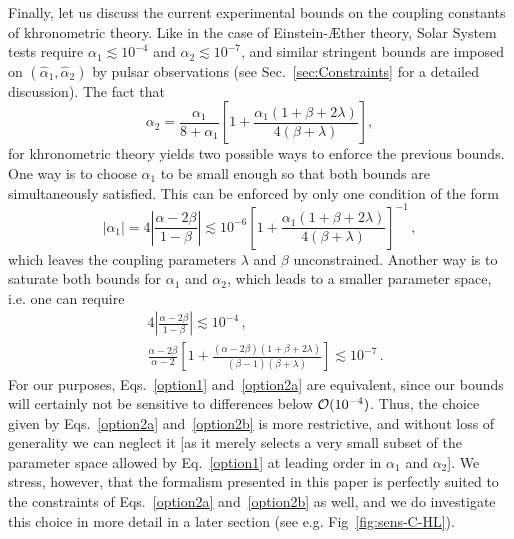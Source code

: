 \documentclass[prd,aps,twocolumn,nofootinbib,showpacs,superscriptaddress]{revtex4-1}
\newcommand\be{\begin{equation}}
\newcommand\ee{\end{equation}}
\begin{document}
Finally, let us discuss the current experimental bounds on the coupling constants of khronometric theory. 
Like in the case of Einstein-\AE ther theory, Solar System 
tests require $\alpha_1\lesssim 10^{-4}$ and $\alpha_2\lesssim 10^{-7}$, and similar stringent bounds
are imposed on $(\hat{\alpha}_1,\hat{\alpha}_2)$ by pulsar observations (see Sec.~\ref{sec:Constraints} for a detailed discussion). The fact that 
\be
\alpha_2=\frac{\alpha_1}{8+\alpha_1}\left[1+\frac{\alpha_1(1+\beta+2\lambda)}{4(\beta+\lambda)}\right],
\ee 
for khronometric theory \cite{Blas:2011zd}
 yields two possible ways 
to enforce the previous bounds. One way is to choose $\alpha_1$ to be small enough so that both bounds are simultaneously satisfied. This can be enforced by only one condition of the form
\be\label{option1}
|\alpha_{1}| = 4 \left|\frac{\alpha-2\beta}{1-\beta}\right|\lesssim 10^{-6} \left[1+\frac{\alpha_1(1+\beta+2\lambda)}{4(\beta+\lambda)}\right]^{-1}\,,
\ee 
which leaves the coupling parameters $\lambda$ and $\beta$ unconstrained. Another way is to saturate both bounds for $\alpha_1$ and $\alpha_2$, which leads to a smaller parameter space, i.e. one can require 
\begin{align}\label{option2a}
& 4 \left|\frac{\alpha-2\beta}{1-\beta}\right| \lesssim 10^{-4}\,,
\\
\label{option2b}
&\frac{\alpha - 2 \beta}{\alpha -2 }\left[1+\frac{(\alpha-2 \beta) (1+\beta+2\lambda)}{(\beta - 1) (\beta+\lambda)}\right] \lesssim 10^{-7}\,.
\end{align}
For our purposes, Eqs.~\eqref{option1} and~\eqref{option2a} are equivalent, since our bounds will certainly not
be sensitive to differences below ${\cal O}(10^{-4})$. Thus, the choice given by Eqs.~\eqref{option2a} and~\eqref{option2b}
is more restrictive, and without loss of generality we can neglect it [as it merely selects 
a very small subset of the parameter space allowed by Eq.~\eqref{option1} at leading order in $\alpha_1$ and $\alpha_2$].
We stress, however, that the formalism presented in this paper is perfectly suited to the constraints of Eqs.~\eqref{option2a} and~\eqref{option2b} as well, and we do investigate this choice in more detail in a later section (see e.g. Fig~\ref{fig:sens-C-HL}).
\end{document}
